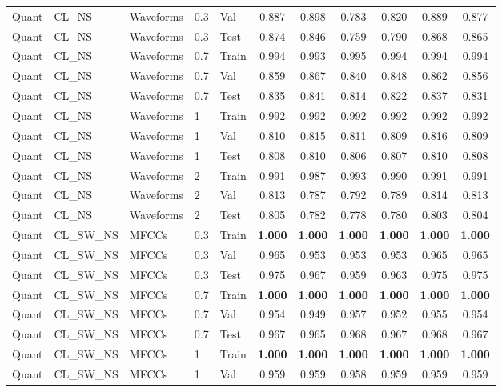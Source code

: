 \begin{landscape}
\begin{longtable}{|l|l|l|l|l|c|c|c|c|c|c|}
Quant & CL\_NS & Waveforms & 0.3 & Val & 0.887 & 0.898 & 0.783 & 0.820 & 0.889 & 0.877 \\
Quant & CL\_NS & Waveforms & 0.3 & Test & 0.874 & 0.846 & 0.759 & 0.790 & 0.868 & 0.865 \\
Quant & CL\_NS & Waveforms & 0.7 & Train & 0.994 & 0.993 & 0.995 & 0.994 & 0.994 & 0.994 \\
Quant & CL\_NS & Waveforms & 0.7 & Val & 0.859 & 0.867 & 0.840 & 0.848 & 0.862 & 0.856 \\
Quant & CL\_NS & Waveforms & 0.7 & Test & 0.835 & 0.841 & 0.814 & 0.822 & 0.837 & 0.831 \\
Quant & CL\_NS & Waveforms & 1 & Train & 0.992 & 0.992 & 0.992 & 0.992 & 0.992 & 0.992 \\
Quant & CL\_NS & Waveforms & 1 & Val & 0.810 & 0.815 & 0.811 & 0.809 & 0.816 & 0.809 \\
Quant & CL\_NS & Waveforms & 1 & Test & 0.808 & 0.810 & 0.806 & 0.807 & 0.810 & 0.808 \\
Quant & CL\_NS & Waveforms & 2 & Train & 0.991 & 0.987 & 0.993 & 0.990 & 0.991 & 0.991 \\
Quant & CL\_NS & Waveforms & 2 & Val & 0.813 & 0.787 & 0.792 & 0.789 & 0.814 & 0.813 \\
Quant & CL\_NS & Waveforms & 2 & Test & 0.805 & 0.782 & 0.778 & 0.780 & 0.803 & 0.804 \\
Quant & CL\_SW\_NS & MFCCs & 0.3 & Train & \textbf{1.000} & \textbf{1.000} & \textbf{1.000} & \textbf{1.000} & \textbf{1.000} & \textbf{1.000} \\
Quant & CL\_SW\_NS & MFCCs & 0.3 & Val & 0.965 & 0.953 & 0.953 & 0.953 & 0.965 & 0.965 \\
Quant & CL\_SW\_NS & MFCCs & 0.3 & Test & 0.975 & 0.967 & 0.959 & 0.963 & 0.975 & 0.975 \\
Quant & CL\_SW\_NS & MFCCs & 0.7 & Train & \textbf{1.000} & \textbf{1.000} & \textbf{1.000} & \textbf{1.000} & \textbf{1.000} & \textbf{1.000} \\
Quant & CL\_SW\_NS & MFCCs & 0.7 & Val & 0.954 & 0.949 & 0.957 & 0.952 & 0.955 & 0.954 \\
Quant & CL\_SW\_NS & MFCCs & 0.7 & Test & 0.967 & 0.965 & 0.968 & 0.967 & 0.968 & 0.967 \\
Quant & CL\_SW\_NS & MFCCs & 1 & Train & \textbf{1.000} & \textbf{1.000} & \textbf{1.000} & \textbf{1.000} & \textbf{1.000} & \textbf{1.000} \\
Quant & CL\_SW\_NS & MFCCs & 1 & Val & 0.959 & 0.959 & 0.958 & 0.959 & 0.959 & 0.959 \\

\end{longtable}
\end{landscape}
